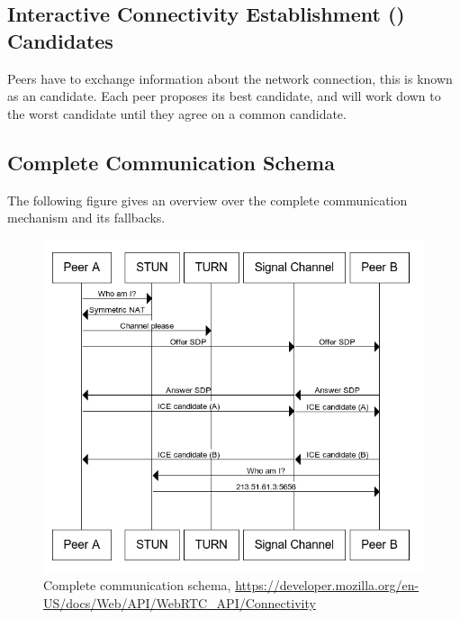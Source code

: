 \subsection{Interactive Connectivity Establishment () Candidates}
Peers have to exchange information about the network connection, this is known as an  candidate. Each peer proposes its best candidate, and will work down to the worst candidate until they agree on a common candidate.

\subsection{Complete Communication Schema}
The following figure gives an overview over the complete communication mechanism and its fallbacks.

\begin{figure}[H]
	\includegraphics[scale=0.5]{images/webrtc-complete-diagram.png}
	\centering
	\caption{ Complete communication schema, \url{https://developer.mozilla.org/en-US/docs/Web/API/WebRTC_API/Connectivity}}
	\label{fig:WebRTC}
\end{figure}
